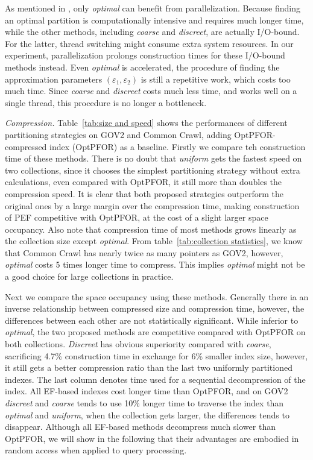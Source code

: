 \documentclass[runningheads,a4paper]{llncs}
\begin{document}
As mentioned in \cite{ottaviano2014partitioned}, only \textit{optimal} can benefit from parallelization.
Because finding an optimal partition is computationally intensive and requires much longer time, while the other methods, including \textit{coarse} and \textit{discreet}, are actually I/O-bound.
For the latter, thread switching might consume extra system resources.
In our experiment, parallelization prolongs construction times for these I/O-bound methods instead.
Even \textit{optimal} is accelerated, the procedure of finding the approximation parameters $ \left( \varepsilon_1, \varepsilon_2 \right) $ is still a repetitive work, which costs too much time.
Since \textit{coarse} and \textit{discreet} costs much less time, and works well on a single thread, this procedure is no longer a bottleneck.

\textit{Compression.} Table~\ref{tab:size and speed} shows the performances of different partitioning strategies on GOV2 and Common Crawl, adding OptPFOR-compressed index (OptPFOR) as a baseline.
Firstly we compare teh construction time of these methods.
There is no doubt that \textit{uniform} gets the fastest speed on two collections, since it chooses the simplest partitioning strategy without extra calculations, even compared with OptPFOR, it still more than doubles the compression speed.
It is clear that both proposed strategies outperform the original ones by a large margin over the compression time, making construction of PEF competitive with OptPFOR, at the cost of a slight larger space occupancy.
Also note that compression time of most methods grows linearly as the collection size except \textit{optimal}.
From table~\ref{tab:collection statistics}, we know that Common Crawl has nearly twice as many pointers as GOV2, however, \textit{optimal} costs 5 times longer time to compress.
This implies \textit{optimal} might not be a good choice for large collections in practice.

Next we compare the space occupancy using these methods.
Generally there ia an inverse relationship between compressed size and compression time, however, the differences between each other are not statistically significant.
While inferior to \textit{optimal}, the two proposed methods are competitive compared with OptPFOR on both collections.
\textit{Discreet} has obvious superiority compared with \textit{coarse}, sacrificing 4.7\% construction time in exchange for 6\% smaller index size, however, it still gets a better compression ratio than the last two uniformly partitioned indexes.
The last column denotes time used for a sequential decompression of the index.
All EF-based indexes cost longer time than OptPFOR, and on GOV2 \textit{discreet} and \textit{coarse} tends to use 10\% longer time to traverse the index than \textit{optimal} and \textit{uniform}, when the collection gets larger, the differences tends to disappear.
Although all EF-based methods decompress much slower than OptPFOR, we will show in the following that their advantages are embodied in random access when applied to query processing.
\end{document}
